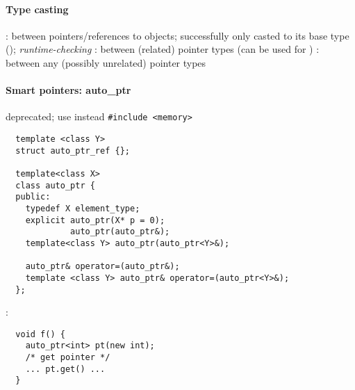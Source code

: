 \documentclass{memo}
\begin{document}
\paragraph{Type casting}
\bit
\w {}: between pointers/references to objects; successfully
only casted to its base type (); {\em runtime-checking\/}
\w {}: between (related) pointer types  (can be used for )
\w {}: between any (possibly unrelated) pointer types
\eit

\paragraph{Smart pointers: auto\_ptr}
\bit
\w deprecated; use  instead
\w \verb+#include <memory>+
\begin{verbatim}
  template <class Y>
  struct auto_ptr_ref {};

  template<class X>
  class auto_ptr {
  public:
    typedef X element_type;
    explicit auto_ptr(X* p = 0);
             auto_ptr(auto_ptr&);
    template<class Y> auto_ptr(auto_ptr<Y>&);

    auto_ptr& operator=(auto_ptr&);
    template <class Y> auto_ptr& operator=(auto_ptr<Y>&);
  };
\end{verbatim}
\w {}:
  \begin{verbatim}
  void f() {
    auto_ptr<int> pt(new int);
    /* get pointer */
    ... pt.get() ... 
  }
  \end{verbatim}
\eit
\end{document}
